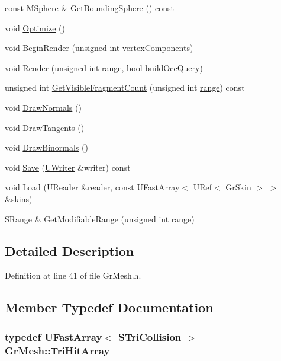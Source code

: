 \begin{CompactItemize}
\item 
const \hyperlink{class_m_sphere}{MSphere} \& \hyperlink{class_gr_mesh_dfd6378a686044cfd6d1599d7ee1b00c}{GetBoundingSphere} () const 
\item 
void \hyperlink{class_gr_mesh_3b9775285ccb15047c7ec7d026b1553c}{Optimize} ()
\item 
void \hyperlink{class_gr_mesh_2e37339a92db06216e801375e8c2ffc3}{BeginRender} (unsigned int vertexComponents)
\item 
void \hyperlink{class_gr_mesh_44d75d42f7e25e048904ed371e276a81}{Render} (unsigned int \hyperlink{glext__bak_8h_7b8ad0b27a927682837f95528fa454f5}{range}, bool buildOccQuery)
\item 
unsigned int \hyperlink{class_gr_mesh_7a74c51e8e35a304afd20334129e1815}{GetVisibleFragmentCount} (unsigned int \hyperlink{glext__bak_8h_7b8ad0b27a927682837f95528fa454f5}{range}) const 
\item 
void \hyperlink{class_gr_mesh_68406b099ee7e6a796ba4ca230cb73a8}{DrawNormals} ()
\item 
void \hyperlink{class_gr_mesh_04d6da4023764e8fad5e8824bf0bcb56}{DrawTangents} ()
\item 
void \hyperlink{class_gr_mesh_a2f68d017f548b65b3a7a23cf451d71d}{DrawBinormals} ()
\item 
void \hyperlink{class_gr_mesh_ead45c368e214350ddb2f218471f18cc}{Save} (\hyperlink{class_u_writer}{UWriter} \&writer) const 
\item 
void \hyperlink{class_gr_mesh_4ade8286c992e61e1029bab4e75a4eb9}{Load} (\hyperlink{class_u_reader}{UReader} \&reader, const \hyperlink{class_u_fast_array}{UFastArray}$<$ \hyperlink{class_u_ref}{URef}$<$ \hyperlink{class_gr_skin}{GrSkin} $>$ $>$ \&skins)
\item 
\hyperlink{struct_gr_mesh_1_1_s_range}{SRange} \& \hyperlink{class_gr_mesh_fbbb46fe871032427705b2dc9e306b6d}{GetModifiableRange} (unsigned int \hyperlink{glext__bak_8h_7b8ad0b27a927682837f95528fa454f5}{range})
\end{CompactItemize}


\subsection{Detailed Description}


Definition at line 41 of file GrMesh.h.

\subsection{Member Typedef Documentation}
\hypertarget{class_gr_mesh_9c88d279a741b50fc9011262f7d73b81}{
\subsubsection[{TriHitArray}]{\setlength{\rightskip}{0pt plus 5cm}typedef {\bf UFastArray}$<$ {\bf STriCollision} $>$ {\bf GrMesh::TriHitArray}}}
\label{class_gr_mesh_9c88d279a741b50fc9011262f7d73b81}




